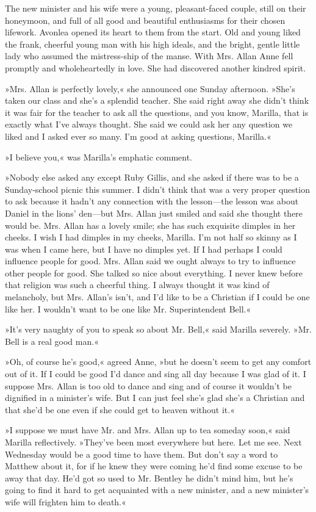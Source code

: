 The new minister and his wife were a young, pleasant-faced couple, still on their honeymoon, and full of all good and beautiful enthusiasms for their chosen lifework. Avonlea opened its heart to them from the start. Old and young liked the frank, cheerful young man with his high ideals, and the bright, gentle little lady who assumed the mistress-ship of the manse. With Mrs. Allan Anne fell promptly and wholeheartedly in love. She had discovered another kindred spirit.

»Mrs. Allan is perfectly lovely,« she announced one Sunday afternoon. »She's taken our class and she's a splendid teacher. She said right away she didn't think it was fair for the teacher to ask all the questions, and you know, Marilla, that is exactly what I've always thought. She said we could ask her any question we liked and I asked ever so many. I'm good at asking questions, Marilla.«

»I believe you,« was Marilla's emphatic comment.

»Nobody else asked any except Ruby Gillis, and she asked if there was to be a Sunday-school picnic this summer. I didn't think that was a very proper question to ask because it hadn't any connection with the lesson—the lesson was about Daniel in the lions' den—but Mrs. Allan just smiled and said she thought there would be. Mrs. Allan has a lovely smile; she has such exquisite dimples in her cheeks. I wish I had dimples in my cheeks, Marilla. I'm not half so skinny as I was when I came here, but I have no dimples yet. If I had perhaps I could influence people for good. Mrs. Allan said we ought always to try to influence other people for good. She talked so nice about everything. I never knew before that religion was such a cheerful thing. I always thought it was kind of melancholy, but Mrs. Allan's isn't, and I'd like to be a Christian if I could be one like her. I wouldn't want to be one like Mr. Superintendent Bell.«

»It's very naughty of you to speak so about Mr. Bell,« said Marilla severely. »Mr. Bell is a real good man.«

»Oh, of course he's good,« agreed Anne, »but he doesn't seem to get any comfort out of it. If I could be good I'd dance and sing all day because I was glad of it. I suppose Mrs. Allan is too old to dance and sing and of course it wouldn't be dignified in a minister's wife. But I can just feel she's glad she's a Christian and that she'd be one even if she could get to heaven without it.«

»I suppose we must have Mr. and Mrs. Allan up to tea someday soon,« said Marilla reflectively. »They've been most everywhere but here. Let me see. Next Wednesday would be a good time to have them. But don't say a word to Matthew about it, for if he knew they were coming he'd find some excuse to be away that day. He'd got so used to Mr. Bentley he didn't mind him, but he's going to find it hard to get acquainted with a new minister, and a new minister's wife will frighten him to death.«

